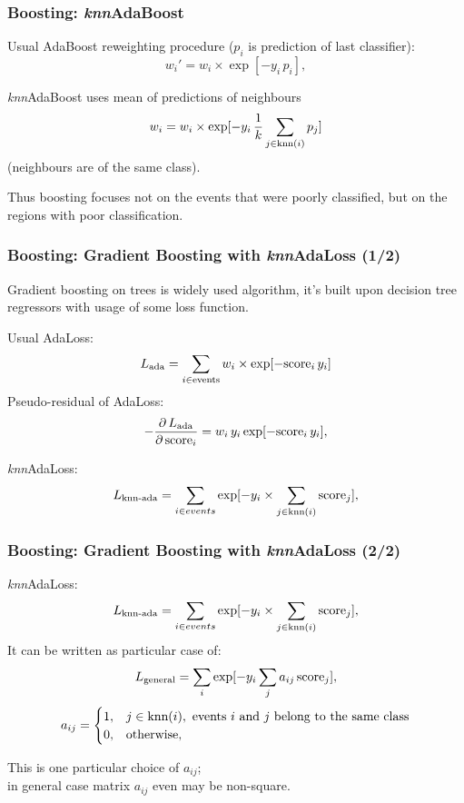 \documentclass{beamer}
\begin{document}
\begin{frame}[t]
    \frametitle{Boosting: \textit{knn}AdaBoost}
    Usual AdaBoost reweighting procedure ($p_i$ is prediction of last classifier):
    \[
        w_i' = w_i \times \exp[-y_i \, p_i],
    \]

    \textit{knn}AdaBoost uses mean of predictions of neighbours 
    \[
        w_i = w_i \times \exp[-y_i \, \dfrac{1}{k} \sum_{j \in \text{knn}(i)} p_j]
    \]
    (neighbours are of the same class).

    Thus boosting focuses not on the events that were poorly classified, but on the regions with poor classification.
\end{frame}

\begin{frame}[t]
    \frametitle{Boosting: Gradient Boosting with \textit{knn}AdaLoss (1/2) }
    Gradient boosting on trees is widely used algorithm, 
    it's built upon decision tree regressors with usage of some loss function. 


    Usual AdaLoss:
    \[
        L_\text{ada} = \sum_{i \in \text{events}} w_i \times \exp [- \text{score}_i \, y_i] 
    \]
    Pseudo-residual of AdaLoss:
    \[
        -\dfrac{\partial \, L_\text{ada}}{\partial \, \text{score}_i} = w_i \, y_i \exp[- \text{score}_i \, y_i],
    \]

    \textit{knn}AdaLoss:
    \[
        L_\text{knn-ada} = \sum_{i \in events} \exp[-y_i \times \sum_{j \in \text{knn}(i)} \text{score}_j],
    \]

\end{frame}

\begin{frame}[t]
    \frametitle{Boosting: Gradient Boosting with \textit{knn}AdaLoss (2/2)}
    \textit{knn}AdaLoss:
    \[
        L_\text{knn-ada} = \sum_{i \in events} \exp[-y_i \times \sum_{j \in \text{knn}(i)} \text{score}_j],
    \]
    It can be written as particular case of:
    \[
        L_\text{general} = \sum_i \exp [- y_i \sum_j a_{ij} \, \text{score}_j ],
    \]
    \[
        a_{ij} = 
        \begin{cases} 
            1, & j \in \text{knn}(i), \text{ events $i$ and $j$ belong to the same class} \\
            0, & \text{otherwise},
        \end{cases}
    \]

    This is one particular choice of $a_{ij}$; \\
    in general case matrix $a_{ij}$ even may be non-square.

\end{frame}
\end{document}
